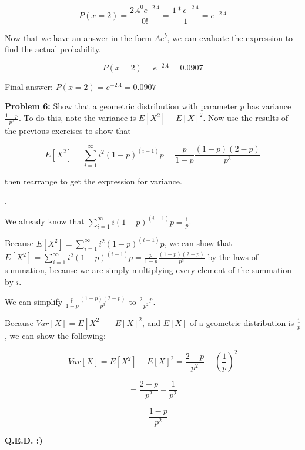 \documentclass{article}
\begin{document}
 \[P(x=2) = \frac{2.4^0e^{-2.4}}{0!} = \frac{1*e^{-2.4}}{1} = e^{-2.4}\]
 
 Now that we have an answer in the form $Ae^b$, we can evaluate the expression to find the actual probability.
 
 \[P(x=2) = e^{-2.4} = 0.0907\]
 
 Final answer: $P(x=2) = e^{-2.4} = 0.0907$\newline
 
 \newpage
 
  \begin{center}
    \Large\textbf{Problem 6:} Show that a geometric distribution with parameter $p$ has variance $\frac{1-p}{p^2}$. To do this, note the variance is $E[X^2]-{E[X]}^2$. Now use the results of the previous exercises to show that 
 
    \[E[X^2]=\sum_{i=1}^{\infty}i^2(1-p)^{(i-1)}p=\frac{p}{1-p}\frac{(1-p)(2-p)}{p^3}\]
 
    then rearrange to get the expression for variance.\par
    
 \end{center}
 
 .\newline
 
 We already know that $\sum_{i=1}^{\infty}i(1-p)^{(i-1)}p=\frac{1}{p}$.\newline
 
 Because $E[X^2] = \sum_{i=1}^{\infty}i^2(1-p)^{(i-1)}p$, we can show that $E[X^2]=\sum_{i=1}^{\infty}i^2(1-p)^{(i-1)}p=\frac{p}{1-p}\frac{(1-p)(2-p)}{p^3}$ by the laws of summation, because we are simply multiplying every element of the summation by $i$.\newline
 
 We can simplify $\frac{p}{1-p}\frac{(1-p)(2-p)}{p^3}$ to $\frac{2-p}{p^2}$.\newline
 
 Because $Var[X] = E[X^2] - E[X]^2$, and $E[X]$ of a geometric distribution is $\frac{1}{p}$, we can show the following:
 
 \[Var[X] = E[X^2] - E[X]^2 = \frac{2-p}{p^2} - (\frac{1}{p})^2\]
 
 \[= \frac{2-p}{p^2} - \frac{1}{p^2}\]
 
 \[= \frac{1-p}{p^2}\]
 
 \begin{center}
     \Large\textbf{Q.E.D. :)}
 \end{center}
 
 
\end{document}
